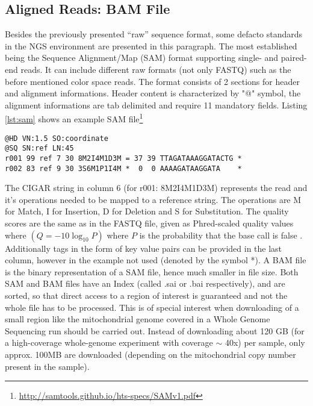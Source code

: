 \subsection{Aligned Reads: BAM File}
Besides the previously presented "`raw"' sequence format, some defacto standards in the NGS environment are presented in this paragraph. The most established being the Sequence Alignment/Map (SAM) format \cite{Li2009} supporting single- and paired-end reads. It can include different raw formats (not only FASTQ) such as the before mentioned color space reads. The format consists of 2 sections for header and alignment informations. Header content is characterized by "@" symbol, the alignment informations are tab delimited and require 11 mandatory fields. Listing \ref{lst:sam} shows an example SAM file\footnote{\url{http://samtools.github.io/hts-specs/SAMv1.pdf}} 
\begin{lstlisting}[caption= {Excerpt of a SAM file, representing two reads, r001 and r002}, label={lst:sam}]
@HD VN:1.5 SO:coordinate
@SQ SN:ref LN:45
r001 99 ref 7 30 8M2I4M1D3M = 37 39 TTAGATAAAGGATACTG *
r002 83 ref 9 30 3S6M1P1I4M *  0  0 AAAAGATAAGGATA    *
\end{lstlisting}
The CIGAR string in column 6 (for r001: 8M2I4M1D3M) represents the read and it's operations needed to be mapped to a reference string. The operations are M for Match, I for Insertion, D for Deletion and S for Substitution. 
The quality scores are the same as in the FASTQ file, given as Phred-scaled quality values where $\left( Q=-10\log_{10} P\right)$ where $P$ is the probability that the base call is false \cite{Loman2012}. Additionally tags in the form of key value pairs can be provided in the last column, however in the example not used (denoted by the symbol *).
A BAM file is the binary representation of a SAM file, hence much smaller in file size. Both SAM and BAM files have an Index (called .sai or .bai respectively), and are sorted, so that direct access to a region of interest is guaranteed and not the whole file has to be processed. This is of special interest when downloading of a small region like the mitochondrial genome covered in a Whole Genome Sequencing run should be carried out. Instead of downloading about 120 GB (for a high-coverage whole-genome experiment with coverage $\sim$ 40x) per sample, only approx. 100MB are downloaded (depending on the mitochondrial copy number present in the sample).
